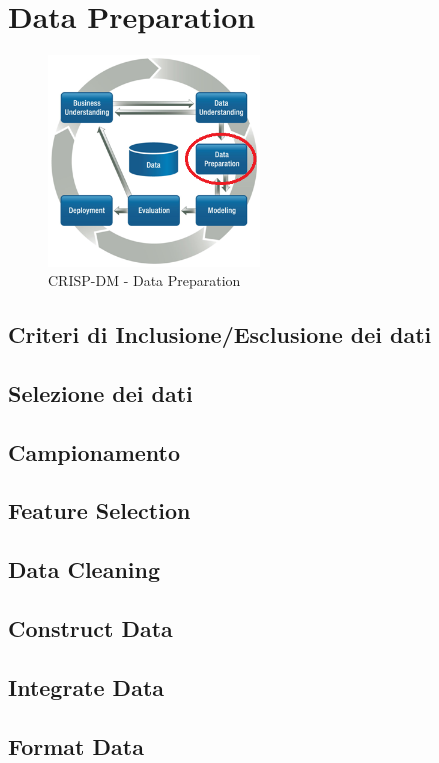 \chapter{Data Preparation}

\begin{figure}[hbtp]
	\centering
	\includegraphics[width=0.5\textwidth]{./images/CRISPDM_3.png}
	\caption{CRISP-DM - Data Preparation}
	\label{CRISPDM_3}
\end{figure}



\section{Criteri di Inclusione/Esclusione dei dati}

\section{Selezione dei dati}

\section{Campionamento}

\section{Feature Selection}

\section{Data Cleaning}

\section{Construct Data}

\section{Integrate Data}

\section{Format Data}
